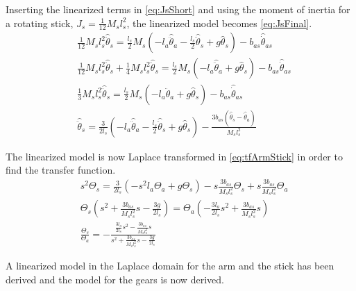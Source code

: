 Inserting the linearized terms in \autoref{eq:JsShort} and using the moment of inertia for a rotating stick, $J_s=\frac{1}{12}M_sl_s^2$, the linearized model becomes \eqref{eq:JsFinal}.
\begin{subequations}
\begin{flalign}
& \frac{1}{12}M_sl_s^2\hat{\ddot{\theta}}_s=\frac{l_s}{2}M_s\left(-l_a\hat{\ddot{\theta}}_a-\frac{l_s}{2}\hat{\ddot{\theta}}_s+g\hat{\theta}_s\right)-b_{as}\hat{\dot{\theta}}_{as}   \\
& \frac{1}{12}M_sl_s^2\hat{\ddot{\theta}}_s+\frac{1}{4}M_sl_s^2\hat{\ddot{\theta}}_s=\frac{l_s}{2}M_s\left(-l_a\hat{\ddot{\theta}}_a+g\hat{\theta}_s\right)-b_{as}\hat{\dot{\theta}}_{as}   \\
& \frac{1}{3}M_sl_s^2\hat{\ddot{\theta}}_s=\frac{l_s}{2}M_s\left(-l_a\hat{\ddot{\theta}}_a+g\hat{\theta}_s\right)-b_{as}\hat{\dot{\theta}}_{as}   \\
& \hat{\ddot{\theta}}_s=\frac{3}{2l_s}\left(-l_a\hat{\ddot{\theta}}_a-\frac{l_s}{2}\hat{\ddot{\theta}}_s+g\hat{\theta}_s\right)-\frac{3b_{as}\left(\hat{\dot{\theta}}_s-\hat{\dot{\theta}}_a\right)}{M_sl_s^2} \label{eq:JsFinal}
\end{flalign}
\end{subequations}

The linearized model is now Laplace transformed in \autoref{eq:tfArmStick} in order to find the transfer function.
\begin{subequations}
\begin{flalign}
& s^2\Theta_s=\frac{3}{2l_s}\left(-s^2l_a\Theta_a+g\Theta_s\right)-s\frac{3b_{as}}{M_sl_s^2}\Theta_s+s\frac{3b_{as}}{M_sl_s^2}\Theta_a  \\
& \Theta_s\left(s^2+\frac{3b_{as}}{M_sl_s^2}s-\frac{3g}{2l_s}\right)=\Theta_a\left(-\frac{3l_a}{2l_s}s^2+\frac{3b_{as}}{M_sl_s^2}s\right)  \\
& \frac{\Theta_s}{\Theta_a}=-\frac{\frac{3l_a}{2l_s}s^2-\frac{3b_{as}}{M_sl_s^2}s}{s^2+\frac{3b_{as}}{M_sl_s^2}s-\frac{3g}{2l_s}} \label{eq:tfArmStick}
\end{flalign}
\end{subequations}

A linearized model in the Laplace domain for the arm and the stick has been derived and the model for the gears is now derived.
